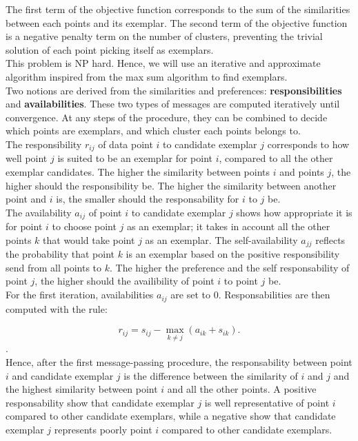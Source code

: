 \documentclass{ipol}
\begin{document}
The first term of the objective function corresponds to the sum of the
similarities between each points and its exemplar. The second term of the
objective function is a negative penalty term on the number of clusters,
preventing the trivial solution of each point picking itself as exemplars. \\

This problem is NP hard. Hence, we will use an iterative and
approximate algorithm inspired from the max sum algorithm to find exemplars.
\\

Two notions are derived from the similarities and preferences:
\textbf{responsibilities} and \textbf{availabilities}. These two types of
messages are computed iteratively until convergence. At any steps of the
procedure, they can be combined to decide which points are exemplars, and
which cluster each points belongs to.\\

The responsibility $r_{ij}$ of data point $i$ to candidate exemplar $j$
corresponds to how well point $j$ is suited to be an exemplar for point $i$,
compared to all the other exemplar candidates. The higher the similarity
between points $i$ and points $j$, the higher should the responsibility be.
The higher the similarity between another point and $i$ is, the smaller should
the responsability for $i$ to $j$ be.\\

The availability $a_{ij}$ of point $i$ to candidate exemplar $j$ shows how
appropriate it is for point $i$ to choose point $j$ as an exemplar; it takes
in account all the other points $k$ that would take point $j$ as an exemplar.
The self-availability $a_{jj}$ reflects the probability that point $k$ is an
exemplar based on the positive responsibility send from all points to $k$. The
higher the preference and the self responsability of point $j$, the higher
should the availibility of point $i$ to point $j$ be. \\

For the first iteration, availabilities $a_{ij}$ are set to 0.
Responsabilities are then computed with the rule:

\begin{equation*}
r_{ij} = s_{ij} - \max_{k \neq j} (a_{ik} + s_{ik}).
\end{equation*}.
\\

Hence, after the first message-passing procedure, the responsability between
point $i$ and candidate exemplar $j$ is the difference between the similarity
of $i$ and $j$ and the highest similarity between point $i$ and all the other
points. A positive responsability show that candidate exemplar $j$ is well
representative of point $i$ compared to other candidate exemplars, while a
negative show that candidate exemplar $j$ represents poorly point $i$ compared
to other candidate exemplars. \\
\end{document}
